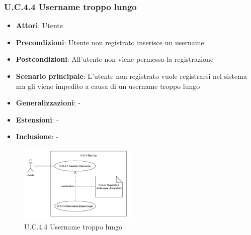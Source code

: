 \subsubsection{U.C.4.4 Username troppo lungo}
\begin{itemize}
    \item \textbf{Attori}: Utente
    \item \textbf{Precondizioni}: Utente non registrato inserisce un username
    \item \textbf{Postcondizioni}: All'utente non viene permessa la registrazione
    \item \textbf{Scenario principale}: L’utente non registrato vuole registrarsi nel sistema ma gli viene impedito a causa di un username troppo lungo
    \item \textbf{Generalizzazioni}: -
    \item \textbf{Estensioni}: -
    \item \textbf{Inclusione}: -
\end{itemize}
\begin{figure}[h!]
    \centering
    \includegraphics[width=0.5\textwidth]{img/UC4-4.png}
    \caption{U.C.4.4 Username troppo lungo}
\end{figure}
\newpage
